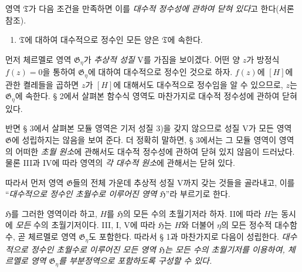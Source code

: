 영역 $\mathfrak T$가 다음 조건을 만족하면 이를 \emph{대수적 정수성에 관하여 닫혀 있다}고 한다(서론 참조).
\begin{enumerate}
\item[V.] $\mathfrak T$에 대하여 대수적으로 정수인 모든 양은 $\mathfrak T$에 속한다.
\end{enumerate}

먼저 체르멜로 영역 $\mathfrak G_\eta$가 \emph{추상적 성질} V를 가짐을 보이겠다. 어떤 양 $z$가 방정식 $f(z)=0$을 통하여 $\mathfrak G_\eta$에 대하여 대수적으로 정수인 것으로 하자. $f(z)$에 $[H]$에 관한 켤레들을 곱하면 $z$가 $[H]$에 대해서도 대수적으로 정수임을 알 수 있으므로, $z$는 $\mathfrak G_\eta$에 속한다. § 2에서 살펴본 함수식 영역도 마찬가지로 대수적 정수성에 관하여 닫혀 있다.

반면 § 3에서 살펴본 모듈 영역은 기저 성질 3)을 갖지 않으므로 성질 V가 모든 영역 $\mathfrak G$에 성립하지는 않음을 보여 준다. 더 정확히 말하면, § 3에서는 그 모듈 영역이 영역의 어떠한 \emph{초월 원소}에 관해서도 대수적 정수성에 관하여 닫혀 있지 않음이 드러났다. 물론 III과 IV에 따라 영역의 \emph{각 대수적 원소}에 관해서는 닫혀 있다.

따라서 먼저 영역 $\mathfrak G$들의 전체 가운데 추상적 성질 V까지 갖는 것들을 골라내고, 이를 ``\emph{대수적으로 정수인 초월수로 이루어진 영역 $\mathfrak H$}''라 부르기로 한다.

$\mathfrak H$를 그러한 영역이라 하고, $H$를 $\mathfrak H$의 모든 수의 초월기저라 하자. II에 따라 $H$는 동시에 \emph{모든} 수의 초월기저이다. III, I, V에 따라 $\mathfrak H$는 $H$와 더불어 $\eta$의 모든 정수적 대수함수, 곧 체르멜로 영역 $\mathfrak G_\eta$도 포함한다. 따라서 § 1과 마찬가지로 다음이 성립한다. \emph{대수적으로 정수인 초월수로 이루어진 모든 영역 $\mathfrak H$는 모든 수의 초월기저를 이용하여, 체르멜로 영역 $\mathfrak G_\eta$를 부분정역으로 포함하도록 구성할 수 있다.}

